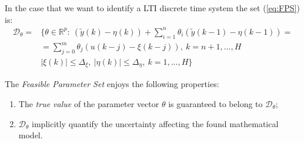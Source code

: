 \hspace*{-5mm}
%

\noindent
In the case that we want to identify a LTI discrete time system the set (\ref{eq:FPS}) is:
{\large{
    \begin{equation}
        \begin{aligned}
            \mathcal{D}_\theta =&\{
                \theta\in\mathbb{R}^p: \ 
                (\tilde{y}(k)-\eta(k))+
                \sum_{i=1}^n {\theta_i (\tilde{y}(k-1)-\eta(k-1))} =\\ &=\sum_{j=0}^m {\theta_j} (u(k-j)-\xi(k-j)), \ k=n+1, ..., H \\
                &\vert \xi(k) \vert \le \Delta_\xi, \ 
                \vert \eta(k) \vert \le \Delta_\eta, \ 
                k=1,...,H
            \}
        \end{aligned}
    \end{equation}    
}}

\noindent
The \textit{Feasible Parameter Set} enjoys the following properties:
\begin{enumerate}
    \itemsep0em
    \item The \textit{true value} of the parameter vector $\theta$ is guaranteed to belong to $\mathcal{D}_\theta$; 
    \item $\mathcal{D}_\theta$ implicitly quantify the uncertainty affecting the found mathematical model.
\end{enumerate}

